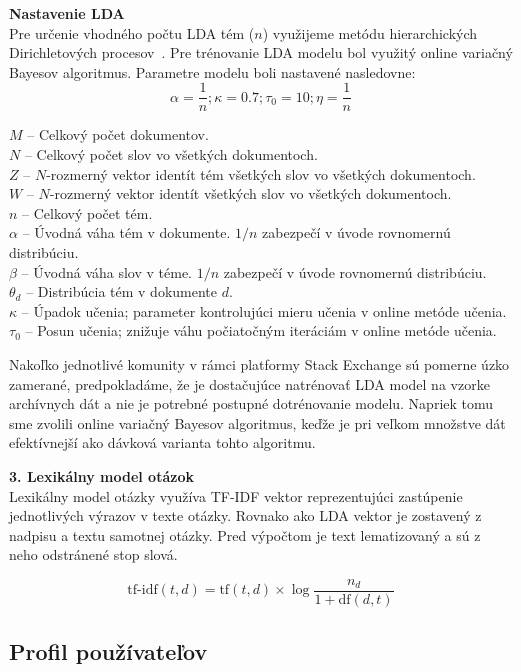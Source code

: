 \begin{adjustwidth}{1cm}{1cm}
\textbf{Nastavenie LDA}\\
\label{design:lda-setup}
Pre určenie vhodného počtu LDA tém ($n$) využijeme metódu hierarchických Dirichletových procesov~\cite{Teh2006}.
Pre trénovanie LDA modelu bol využitý online variačný Bayesov algoritmus. Parametre modelu boli nastavené nasledovne:\\
$$\alpha = \frac{1}{n}; \kappa = 0.7; \tau_0 = 10; \eta = \frac{1}{n}$$

$M$ -- Celkový počet dokumentov. \\
$N$ -- Celkový počet slov vo všetkých dokumentoch. \\
$Z$ -- $N$-rozmerný vektor identít tém všetkých slov vo všetkých dokumentoch. \\
$W$ -- $N$-rozmerný vektor identít všetkých slov vo všetkých dokumentoch. \\
$n$ -- Celkový počet tém. \\
$\alpha$   -- Úvodná váha tém v dokumente. $1/n$ zabezpečí v úvode rovnomernú distribúciu.\\
$\beta$    -- Úvodná váha slov v téme. $1/n$ zabezpečí v úvode rovnomernú distribúciu.\\
$\theta_d$ -- Distribúcia tém v dokumente $d$. \\
$\kappa$   -- Úpadok učenia; parameter kontrolujúci mieru učenia v online metóde učenia. \\
$\tau_0$   -- Posun učenia; znižuje váhu počiatočným iteráciám v online metóde učenia.

Nakoľko jednotlivé komunity v rámci platformy Stack Exchange sú pomerne úzko zamerané, predpokladáme, že je dostačujúce
natrénovať LDA model na vzorke archívnych dát a nie je potrebné postupné dotrénovanie modelu. Napriek tomu sme zvolili
online variačný Bayesov algoritmus, keďže je pri veľkom množstve dát efektívnejší ako dávková varianta tohto algoritmu.
\end{adjustwidth}

\textbf{3. Lexikálny model otázok}\\
Lexikálny model otázky využíva TF-IDF vektor reprezentujúci zastúpenie jednotlivých výrazov v texte otázky. Rovnako ako
LDA vektor je zostavený z nadpisu a textu samotnej otázky. Pred výpočtom je text lematizovaný a sú z neho odstránené
stop slová.

$$\textrm{tf-idf}(t, d) = \textrm{tf}(t, d) \times \log\frac{n_d}{1+\textrm{df}(d, t)}$$

\subsection{Profil používateľov}
\label{design:userprofile}

